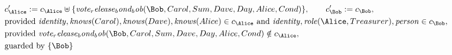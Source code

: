 \begin{align*}
&
c'_
{
\Alice
}
 := 
c_
{
\Alice
}
 \uplus 
\{
\mathit{
vote_release_bond_bob
}
(
\Bob
,
Carol
,
Sum
,
Dave
,
Day
,
Alice
,
Cond
)
\}
, \qquad 
c'_
{
\Bob
}
 := 
c_
{
\Bob
}
,\\
&
\text{provided } 
\mathit{
identity
}
,
\mathit{
knows
}
(
Carol
)
,
\mathit{
knows
}
(
Dave
)
,
\mathit{
knows
}
(
Alice
)
 \in c_
{
\Alice
}
 \text{ and } 
\mathit{
identity
}
,
\mathit{
role
}
(
\Alice
,
Treasurer
)
,
\mathit{
person
}
 \in c_
{
\Bob
}
,\\
&
\text{provided } 
\mathit{
vote_release_bond_bob
}
(
\Bob
,
Carol
,
Sum
,
Dave
,
Day
,
Alice
,
Cond
)
 \notin c_
{
\Alice
}
,\\
&
\text{guarded by } \{
\Bob
\}
\end{align*}

